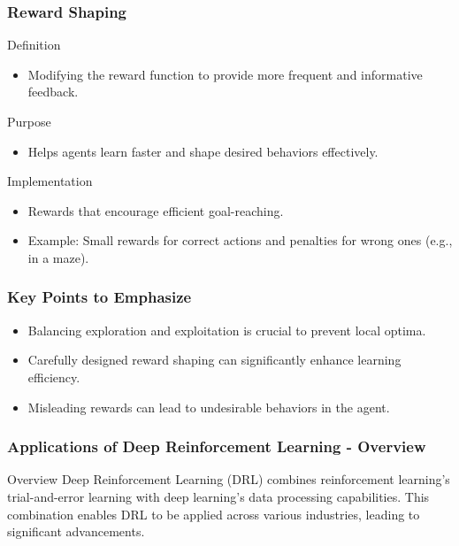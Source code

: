 \documentclass[aspectratio=169]{beamer}
\begin{document}
\begin{frame}[fragile]
    \frametitle{Reward Shaping}
    \begin{block}{Definition}
        \begin{itemize}
            \item Modifying the reward function to provide more frequent and informative feedback.
        \end{itemize}
    \end{block}
    \begin{block}{Purpose}
        \begin{itemize}
            \item Helps agents learn faster and shape desired behaviors effectively.
        \end{itemize}
    \end{block}
    \begin{block}{Implementation}
        \begin{itemize}
            \item Rewards that encourage efficient goal-reaching.
            \item Example: Small rewards for correct actions and penalties for wrong ones (e.g., in a maze).
        \end{itemize}
    \end{block}
\end{frame}

\begin{frame}[fragile]
    \frametitle{Key Points to Emphasize}
    \begin{itemize}
        \item Balancing exploration and exploitation is crucial to prevent local optima.
        \item Carefully designed reward shaping can significantly enhance learning efficiency.
        \item Misleading rewards can lead to undesirable behaviors in the agent.
    \end{itemize}
\end{frame}

\begin{frame}[fragile]
    \frametitle{Applications of Deep Reinforcement Learning - Overview}
    \begin{block}{Overview}
        Deep Reinforcement Learning (DRL) combines reinforcement learning's trial-and-error learning with deep learning's data processing capabilities. This combination enables DRL to be applied across various industries, leading to significant advancements.
    \end{block}
\end{frame}
\end{document}
